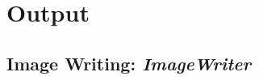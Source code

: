 \documentclass[11pt]{article}      %
\def\HCode#1{}
\def\htmlanchor#1{\HCode{<a id="#1"></a>}}
\begin{document}
\begin{table}[hb]



  \label{tab:bias2}
\end{table}

\clearpage 
\section{Output}
\htmlanchor{ImageWriter}
\subsection{Image Writing:  {\it ImageWriter}}
\label{sec:ImageWriter}
\end{document}
